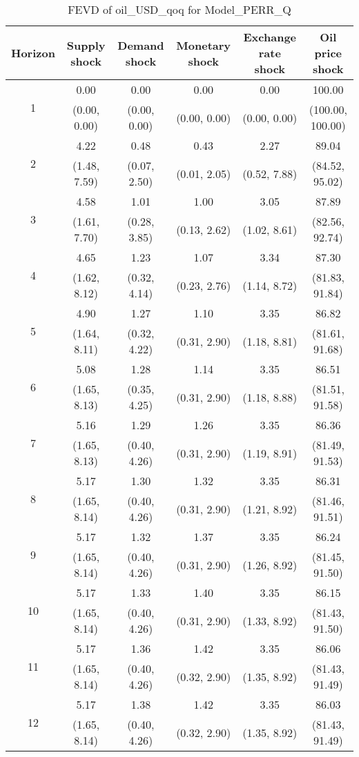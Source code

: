 \documentclass{article}
\begin{document}
\begin{table}
	\footnotesize
	\caption{FEVD of oil_USD_qoq for Model_PERR_Q}
	\begin{tabular}{cccccc}
		Horizon & Supply shock & Demand shock & Monetary shock & Exchange rate shock & Oil price shock\\ \hline
		\multirow{2}{*}{1} & 0.00 & 0.00 & 0.00 & 0.00 & 100.00\\
		 & (0.00, 0.00) & (0.00, 0.00) & (0.00, 0.00) & (0.00, 0.00) & (100.00, 100.00)\\
		\multirow{2}{*}{2} & 4.22 & 0.48 & 0.43 & 2.27 & 89.04\\
		 & (1.48, 7.59) & (0.07, 2.50) & (0.01, 2.05) & (0.52, 7.88) & (84.52, 95.02)\\
		\multirow{2}{*}{3} & 4.58 & 1.01 & 1.00 & 3.05 & 87.89\\
		 & (1.61, 7.70) & (0.28, 3.85) & (0.13, 2.62) & (1.02, 8.61) & (82.56, 92.74)\\
		\multirow{2}{*}{4} & 4.65 & 1.23 & 1.07 & 3.34 & 87.30\\
		 & (1.62, 8.12) & (0.32, 4.14) & (0.23, 2.76) & (1.14, 8.72) & (81.83, 91.84)\\
		\multirow{2}{*}{5} & 4.90 & 1.27 & 1.10 & 3.35 & 86.82\\
		 & (1.64, 8.11) & (0.32, 4.22) & (0.31, 2.90) & (1.18, 8.81) & (81.61, 91.68)\\
		\multirow{2}{*}{6} & 5.08 & 1.28 & 1.14 & 3.35 & 86.51\\
		 & (1.65, 8.13) & (0.35, 4.25) & (0.31, 2.90) & (1.18, 8.88) & (81.51, 91.58)\\
		\multirow{2}{*}{7} & 5.16 & 1.29 & 1.26 & 3.35 & 86.36\\
		 & (1.65, 8.13) & (0.40, 4.26) & (0.31, 2.90) & (1.19, 8.91) & (81.49, 91.53)\\
		\multirow{2}{*}{8} & 5.17 & 1.30 & 1.32 & 3.35 & 86.31\\
		 & (1.65, 8.14) & (0.40, 4.26) & (0.31, 2.90) & (1.21, 8.92) & (81.46, 91.51)\\
		\multirow{2}{*}{9} & 5.17 & 1.32 & 1.37 & 3.35 & 86.24\\
		 & (1.65, 8.14) & (0.40, 4.26) & (0.31, 2.90) & (1.26, 8.92) & (81.45, 91.50)\\
		\multirow{2}{*}{10} & 5.17 & 1.33 & 1.40 & 3.35 & 86.15\\
		 & (1.65, 8.14) & (0.40, 4.26) & (0.31, 2.90) & (1.33, 8.92) & (81.43, 91.50)\\
		\multirow{2}{*}{11} & 5.17 & 1.36 & 1.42 & 3.35 & 86.06\\
		 & (1.65, 8.14) & (0.40, 4.26) & (0.32, 2.90) & (1.35, 8.92) & (81.43, 91.49)\\
		\multirow{2}{*}{12} & 5.17 & 1.38 & 1.42 & 3.35 & 86.03\\
		 & (1.65, 8.14) & (0.40, 4.26) & (0.32, 2.90) & (1.35, 8.92) & (81.43, 91.49)\\
	\end{tabular}
\label{tab:fevd-Model_PERR_Q-oil_USD_qoq}
\end{table}
\end{document}
